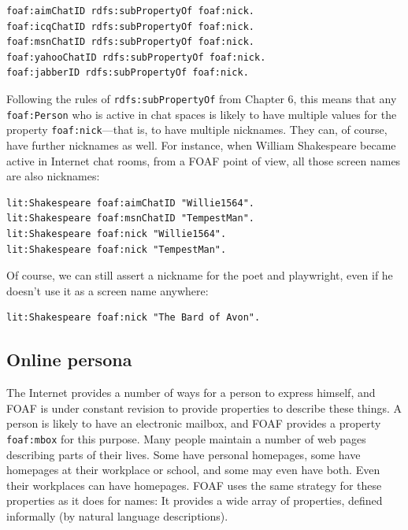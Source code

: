 \begin{lstlisting}
foaf:aimChatID rdfs:subPropertyOf foaf:nick.
foaf:icqChatID rdfs:subPropertyOf foaf:nick.
foaf:msnChatID rdfs:subPropertyOf foaf:nick.
foaf:yahooChatID rdfs:subPropertyOf foaf:nick.
foaf:jabberID rdfs:subPropertyOf foaf:nick.
\end{lstlisting}

Following the rules of \texttt{rdfs:subPropertyOf} from Chapter 6, this means
that any \texttt{foaf:Person} who is active in chat spaces is likely to have
multiple values for the property \texttt{foaf:nick}---that is, to have multiple
nicknames. They can, of course, have further nicknames as well. For
instance, when William Shakespeare became active in Internet chat rooms,
from a FOAF point of view, all those screen names are also nicknames:

\begin{lstlisting}
lit:Shakespeare foaf:aimChatID "Willie1564".
lit:Shakespeare foaf:msnChatID "TempestMan".
lit:Shakespeare foaf:nick "Willie1564".
lit:Shakespeare foaf:nick "TempestMan".
\end{lstlisting}

Of course, we can still assert a nickname for the poet and playwright,
even if he doesn't use it as a screen name anywhere:

\begin{lstlisting}
lit:Shakespeare foaf:nick "The Bard of Avon".
\end{lstlisting}

\subsection{Online persona}

The Internet provides a number of ways for a person to express himself,
and FOAF is under constant revision to provide properties to describe
these things. A person is likely to have an electronic mailbox, and FOAF
provides a property \texttt{foaf:mbox} for this purpose. Many people maintain a
number of web pages describing parts of their lives. Some have personal
homepages, some have homepages at their workplace or school, and some
may even have both. Even their workplaces can have homepages. FOAF uses
the same strategy for these properties as it does for names: It provides
a wide array of properties, defined informally (by natural language
descriptions).

